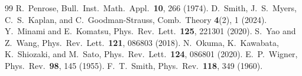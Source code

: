 \documentclass[aps,prd,twocolumn,superscriptaddress,nofootinbib]{revtex4-2}
\begin{document}
\begin{thebibliography}{99}
R.~Penrose, Bull.\ Inst.\ Math.\ Appl.\ \textbf{10}, 266 (1974).
D.~Smith, J.~S.~Myers, C.~S.~Kaplan, and C.~Goodman-Strauss, Comb.\ Theory \textbf{4}(2), 1 (2024).
Y.~Minami and E.~Komatsu, Phys.\ Rev.\ Lett.\ \textbf{125}, 221301 (2020).
S.~Yao and Z.~Wang, Phys.\ Rev.\ Lett.\ \textbf{121}, 086803 (2018).
N.~Okuma, K.~Kawabata, K.~Shiozaki, and M.~Sato, Phys.\ Rev.\ Lett.\ \textbf{124}, 086801 (2020).
E.~P.~Wigner, Phys.\ Rev.\ \textbf{98}, 145 (1955).
F.~T.~Smith, Phys.\ Rev.\ \textbf{118}, 349 (1960).
\end{thebibliography}
\end{document}
